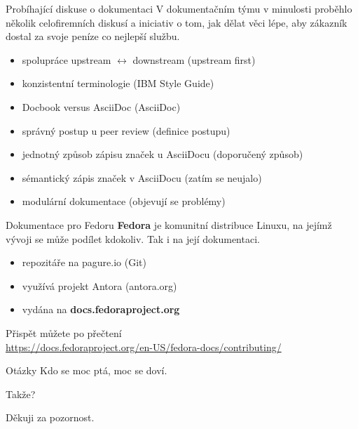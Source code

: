 \documentclass[12pt,a4paper]{beamer}
\begin{document}
	\begin{frame}{Probíhající diskuse o dokumentaci}
	V dokumentačním týmu v minulosti proběhlo několik celofiremních diskusí a iniciativ o tom, jak dělat věci lépe, aby zákazník dostal za svoje peníze co nejlepší službu. 
	
	\begin{itemize}
		\item spolupráce upstream $\longleftrightarrow$ downstream (upstream first)
		\item konzistentní terminologie (IBM Style Guide)
		\item Docbook versus AsciiDoc (AsciiDoc)
		\item správný postup u peer review (definice postupu)
		\item jednotný způsob zápisu značek u AsciiDocu (doporučený způsob)
		\item sémantický zápis značek v AsciiDocu (zatím se neujalo)
		\item modulární dokumentace (objevují se problémy)
	\end{itemize}
	\end{frame}

	\begin{frame}{Dokumentace pro Fedoru}
\textbf{Fedora} je komunitní distribuce Linuxu, na jejímž vývoji se může podílet kdokoliv. Tak i na její dokumentaci.

	\begin{itemize}
		\item repozitáře na pagure.io (Git)
		\item využívá projekt Antora (antora.org)
		\item vydána na \textbf{docs.fedoraproject.org}
	\end{itemize}

	Přispět můžete po přečtení \\
	\url{https://docs.fedoraproject.org/en-US/fedora-docs/contributing/}

	\end{frame}


	\begin{frame}{Otázky}
		Kdo se moc ptá, moc se doví.
		
		\vspace{10pt}
		
		Takže?
	\end{frame}

	\begin{frame}
	Děkuji za pozornost.
	\end{frame}
\end{document}
